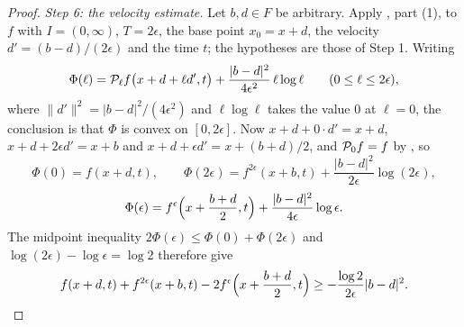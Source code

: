 \begin{proof}
\emph{Step 6: the velocity estimate.}
Let $b,d\in F$ be arbitrary. Apply , part (1), to
$f$ with $I=(0,\infty)$, $T=2\epsilon$, the base point $x_0=x+d$, the velocity
$d'=(b-d)/(2\epsilon)$ and the time $t$; the hypotheses are those of Step 1.
Writing
\[
  \Phi(\ell)=\mathcal{P}_\ell f\bigl(x+d+\ell d',t\bigr)
     +\frac{|b-d|^2}{4\epsilon^2}\,\ell\log\ell
   \qquad(0\le\ell\le2\epsilon),
\]
where $\|d'\|^2=|b-d|^2/(4\epsilon^2)$ and $\ell\log\ell$ takes the value $0$
at $\ell=0$, the conclusion is that $\Phi$ is convex on $[0,2\epsilon]$. Now
$x+d+0\cdot d'=x+d$, $x+d+2\epsilon d'=x+b$ and
$x+d+\epsilon d'=x+(b+d)/2$, and $\mathcal{P}_0f=f$ by , so
\[
  \Phi(0)=f(x+d,t),\qquad
  \Phi(2\epsilon)=f^{2\epsilon}(x+b,t)+\frac{|b-d|^2}{2\epsilon}\log(2\epsilon),
\]
\[
  \Phi(\epsilon)=f^\epsilon\Bigl(x+\frac{b+d}{2},t\Bigr)
     +\frac{|b-d|^2}{4\epsilon}\log\epsilon .
\]
The midpoint inequality $2\Phi(\epsilon)\le\Phi(0)+\Phi(2\epsilon)$ and
$\log(2\epsilon)-\log\epsilon=\log2$ therefore give
\begin{equation}\label{eq:dp-path-midpoint}
  f(x+d,t)+f^{2\epsilon}(x+b,t)
    -2f^\epsilon\Bigl(x+\frac{b+d}{2},t\Bigr)
  \ge-\frac{\log2}{2\epsilon}|b-d|^2 .
\end{equation}


\end{proof}
